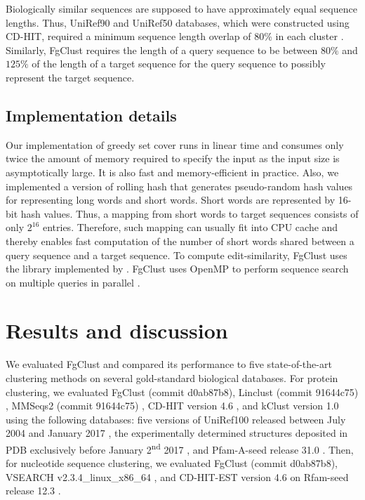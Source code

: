 \documentclass{bioinfo}
\begin{document}
\begin{methods}
Biologically similar sequences are supposed to have approximately equal sequence lengths.
Thus, UniRef90 and UniRef50 databases, which were constructed using CD-HIT, required a minimum sequence length overlap of 80\% in each cluster \citep{suzek2014uniref}.
Similarly, FgClust requires the length of a query sequence to be between \(80\%\) and \(125\%\) of the length of a target sequence for the query sequence to possibly represent the target sequence. 

\subsection{Implementation details}

Our implementation of greedy set cover runs in linear time and consumes only twice the amount of memory required to specify the input as the input size is asymptotically large. It is also fast and memory-efficient in practice. Also, we implemented a version of rolling hash that generates pseudo-random 
hash values for representing long words and short words.
Short words are represented by 16-bit hash values.
Thus, a mapping from short words to target sequences consists of only  \(2^{16}\) entries.
Therefore, such mapping can usually fit into CPU cache and thereby enables fast computation of the number of short words shared between a query sequence and a target sequence.
To compute edit-similarity, FgClust uses the library implemented by \citet{vsovsic2017edlib}.
FgClust uses OpenMP to perform sequence search on multiple queries in parallel \citep{dagum1998openmp}.








\end{methods}

\section{Results and discussion}

We evaluated FgClust and compared its performance to five state-of-the-art clustering methods on several gold-standard biological databases.
For protein clustering,
we evaluated FgClust (commit d0ab87b8),
Linclust (commit 91644c75) \citep{steinegger2017linclust}, 
MMSeqs2 (commit 91644c75) \citep{steinegger2017mmseqs2}, 
CD-HIT version 4.6 \citep{fu2012cd},
and kClust version 1.0 \citep{hauser2013kclust} using the following databases:
five versions of UniRef100 released between July 2004 and January 2017 \citep{suzek2014uniref},
the experimentally determined structures deposited in PDB exclusively before January 2\textsuperscript{nd} 2017 \citep{berman2006protein},
and Pfam-A-seed release 31.0 \citep{finn2016pfam}.
Then, for nucleotide sequence clustering, we evaluated FgClust
(commit d0ab87b8),
VSEARCH v2.3.4\_linux\_x86\_64 \citep{rognes2016vsearch}, and CD-HIT-EST version 4.6 \citep{fu2012cd} on Rfam-seed release 12.3 \citep{nawrocki2014rfam}.
\end{document}
